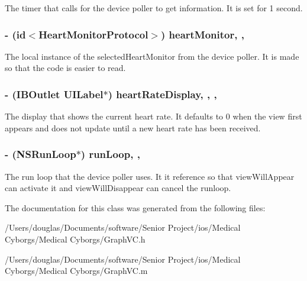 The timer that calls for the device poller to get information. It is set for 1 second. \hypertarget{interface_graph_v_c_ab4c3c7d6990f1e3be550b443e2c7a532}{
\subsubsection[{heart\-Monitor}]{\setlength{\rightskip}{0pt plus 5cm}-\/ (id$<${\bf Heart\-Monitor\-Protocol}$>$) heart\-Monitor\hspace{0.3cm}{\ttfamily [read]}, {\ttfamily [write]}, {\ttfamily [atomic]}}}\label{interface_graph_v_c_ab4c3c7d6990f1e3be550b443e2c7a532}
The local instance of the selected\-Heart\-Monitor from the device poller. It is made so that the code is easier to read. \hypertarget{interface_graph_v_c_ad434b1d838f58441c9d6499936ccd620}{
\subsubsection[{heart\-Rate\-Display}]{\setlength{\rightskip}{0pt plus 5cm}-\/ (I\-B\-Outlet U\-I\-Label$\ast$) heart\-Rate\-Display\hspace{0.3cm}{\ttfamily [read]}, {\ttfamily [write]}, {\ttfamily [nonatomic]}, {\ttfamily [retain]}}}\label{interface_graph_v_c_ad434b1d838f58441c9d6499936ccd620}
The display that shows the current heart rate. It defaults to 0 when the view first appears and does not update until a new heart rate has been received. \hypertarget{interface_graph_v_c_aaeee6afe374009cd16e4a6a1d2270efa}{
\subsubsection[{run\-Loop}]{\setlength{\rightskip}{0pt plus 5cm}-\/ (N\-S\-Run\-Loop$\ast$) run\-Loop\hspace{0.3cm}{\ttfamily [read]}, {\ttfamily [write]}, {\ttfamily [atomic]}}}\label{interface_graph_v_c_aaeee6afe374009cd16e4a6a1d2270efa}
The run loop that the device poller uses. It it reference so that view\-Will\-Appear can activate it and view\-Will\-Disappear can cancel the runloop. 

The documentation for this class was generated from the following files\-:\begin{DoxyCompactItemize}
\item 
/\-Users/douglas/\-Documents/software/\-Senior Project/ios/\-Medical Cyborgs/\-Medical Cyborgs/Graph\-V\-C.\-h\item 
/\-Users/douglas/\-Documents/software/\-Senior Project/ios/\-Medical Cyborgs/\-Medical Cyborgs/Graph\-V\-C.\-m\end{DoxyCompactItemize}
